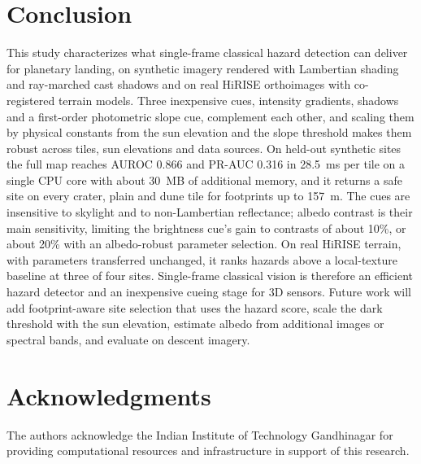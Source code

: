 \documentclass{article}
\begin{document}
\section{Conclusion}
This study characterizes what single-frame classical hazard detection can deliver for planetary landing, on synthetic imagery rendered with Lambertian shading and ray-marched cast shadows and on real HiRISE orthoimages with co-registered terrain models. Three inexpensive cues, intensity gradients, shadows and a first-order photometric slope cue, complement each other, and scaling them by physical constants from the sun elevation and the slope threshold makes them robust across tiles, sun elevations and data sources. On held-out synthetic sites the full map reaches AUROC 0.866 and PR-AUC 0.316 in 28.5~ms per tile on a single CPU core with about 30~MB of additional memory, and it returns a safe site on every crater, plain and dune tile for footprints up to 157~m. The cues are insensitive to skylight and to non-Lambertian reflectance; albedo contrast is their main sensitivity, limiting the brightness cue's gain to contrasts of about 10\%, or about 20\% with an albedo-robust parameter selection. On real HiRISE terrain, with parameters transferred unchanged, it ranks hazards above a local-texture baseline at three of four sites. Single-frame classical vision is therefore an efficient hazard detector and an inexpensive cueing stage for 3D sensors. Future work will add footprint-aware site selection that uses the hazard score, scale the dark threshold with the sun elevation, estimate albedo from additional images or spectral bands, and evaluate on descent imagery.

\section*{Acknowledgments}
The authors acknowledge the Indian Institute of Technology Gandhinagar for providing computational resources and infrastructure in support of this research.



\end{document}
